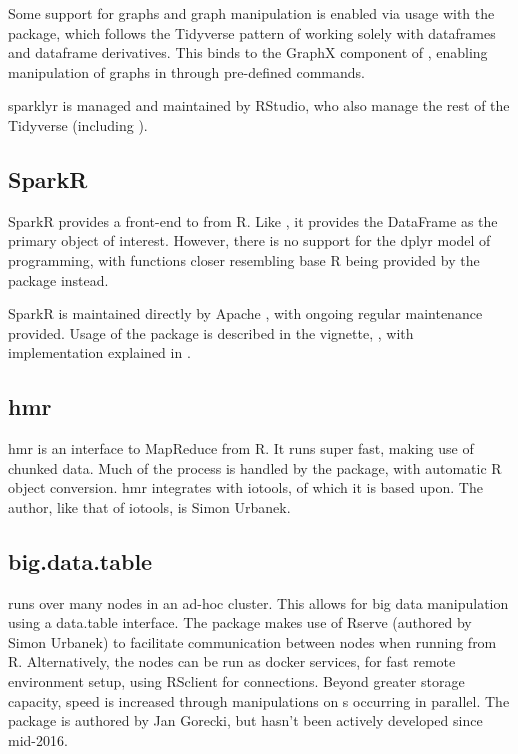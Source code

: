 Some support for graphs and graph manipulation is enabled via usage with
the  package, which follows the Tidyverse pattern of
working solely with dataframes and dataframe derivatives\cite{kuo18}.
This binds to the GraphX component of , enabling manipulation of
graphs in  through pre-defined commands.

sparklyr is managed and maintained by RStudio, who also manage the rest
of the Tidyverse (including ).

\hypertarget{sec:sparklyr}{%
    \subsection{SparkR}\label{sec:sparklyr}}

SparkR provides a front-end to  from
R\cite{venkataraman20:_spark}. Like , it provides the DataFrame
as the primary object of interest. However, there is no support for the
dplyr model of programming, with functions closer resembling base R
being provided by the package instead.

SparkR is maintained directly by Apache , with ongoing regular
maintenance provided. Usage of the package is described in the vignette,
\cite{venktaraman19:_spark_pract_guide}, with implementation
explained in \cite{venkataraman2016sparkr}.

\hypertarget{sec:hmr}{%
    \subsection{hmr}\label{sec:hmr}}

hmr is an interface to MapReduce from R\cite{urbanek20}. It runs super
fast, making use of chunked data. Much of the process is handled by the
package, with automatic R object conversion. hmr integrates with
iotools, of which it is based upon. The author, like that of iotools, is
Simon Urbanek.

\hypertarget{sec:big.data.table}{%
    \subsection{big.data.table}\label{sec:big.data.table}}

 runs  over many nodes in an ad-hoc
cluster\cite{gorecki16}. This allows for big data manipulation using a
data.table interface. The package makes use of Rserve (authored by Simon
Urbanek) to facilitate communication between nodes when running from R.
Alternatively, the nodes can be run as docker services, for fast remote
environment setup, using RSclient for connections. Beyond greater
storage capacity, speed is increased through manipulations on
s occurring in parallel. The package is authored by Jan
Gorecki, but hasn't been actively developed since mid-2016.
